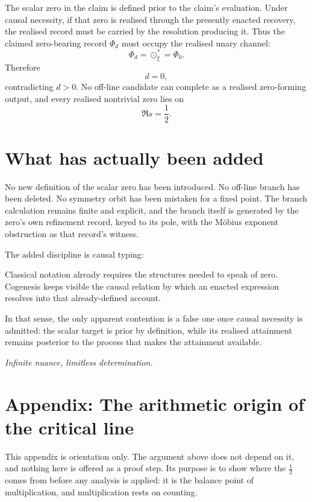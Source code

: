 \documentclass[11pt]{article}
\begin{document}
The scalar zero in the claim is defined prior to the claim's evaluation. Under causal necessity, if that zero is realised through the presently enacted recovery, the realised record must be carried by the resolution producing it. Thus the claimed zero-bearing record \(\Phi_d\) must occupy the realised unary channel:
\[
\Phi_d=\odot_\xi^\ast=\Phi_0.
\]
Therefore
\[
d=0,
\]
contradicting \(d>0\). No off-line candidate can complete as a realised zero-forming output, and every realised nontrivial zero lies on
\[
\Re s=\frac12.
\]

\section{What has actually been added}

No new definition of the scalar zero has been introduced. No off-line branch has been deleted. No symmetry orbit has been mistaken for a fixed point. The branch calculation remains finite and explicit, and the branch itself is generated by the zero's own refinement record, keyed to its pole, with the M\"obius exponent obstruction as that record's witness.

The added discipline is causal typing:

\medskip
\noindent
{}
\medskip

Classical notation already requires the structures needed to speak of zero. Cogenesis keeps visible the causal relation by which an enacted expression resolves into that already-defined account.

In that sense, the only apparent contention is a false one once causal necessity is admitted: the scalar target is prior by definition, while its realised attainment remains posterior to the process that makes the attainment available.

\begin{center}
\vspace{1.15em}
\emph{Infinite nuance, limitless determination.}
\end{center}

\clearpage
\section*{Appendix: The arithmetic origin of the critical line}

This appendix is orientation only. The argument above does not depend on it, and nothing here is offered as a proof step. Its purpose is to show where the \(\tfrac12\) comes from before any analysis is applied: it is the balance point of multiplication, and multiplication rests on counting.
\end{document}
